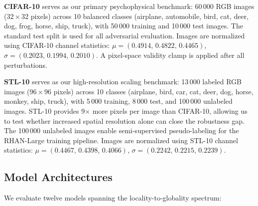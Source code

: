 \documentclass[12pt,a4paper]{article}
\begin{document}
\textbf{CIFAR-10} \citep{krizhevsky2009learning} serves as our primary
psychophysical benchmark: 60\,000 RGB images ($32{\times}32$ pixels) across
10 balanced classes (airplane, automobile, bird, cat, deer, dog, frog, horse,
ship, truck), with 50\,000 training and 10\,000 test images. The standard
test split is used for all adversarial evaluation. Images are normalized
using CIFAR-10 channel statistics:
$\mu{=}(0.4914,\,0.4822,\,0.4465)$,
$\sigma{=}(0.2023,\,0.1994,\,0.2010)$.
A pixel-space validity clamp is applied after all perturbations.

\textbf{STL-10} serves as our high-resolution scaling benchmark: 13\,000
labeled RGB images ($96{\times}96$ pixels) across 10 classes (airplane, bird,
car, cat, deer, dog, horse, monkey, ship, truck), with 5\,000 training,
8\,000 test, and 100\,000 unlabeled images. STL-10 provides 9$\times$ more
pixels per image than CIFAR-10, allowing us to test whether increased spatial
resolution alone can close the robustness gap. The 100\,000 unlabeled images
enable semi-supervised pseudo-labeling for the RHAN-Large training pipeline.
Images are normalized using STL-10 channel statistics:
$\mu{=}(0.4467,\,0.4398,\,0.4066)$,
$\sigma{=}(0.2242,\,0.2215,\,0.2239)$.

\subsection{Model Architectures}

We evaluate twelve models spanning the locality-to-globality spectrum:
\end{document}
